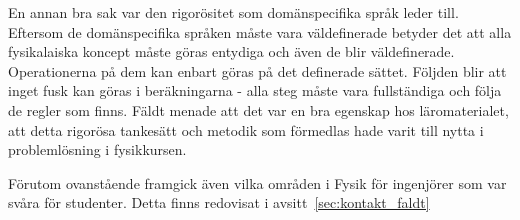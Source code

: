 \begin{draft}
En annan bra sak var den rigorösitet som domänspecifika språk leder till.
Eftersom de domänspecifika språken måste vara väldefinerade betyder det att alla
fysikalaiska koncept måste göras entydiga och även de blir väldefinerade.
Operationerna på dem kan enbart göras på det definerade sättet. Följden blir att
inget fusk kan göras i beräkningarna - alla steg måste vara fullständiga och
följa de regler som finns. Fäldt menade att det var en bra egenskap hos
läromaterialet, att detta rigorösa tankesätt och metodik som förmedlas hade
varit till nytta i problemlösning i fysikkursen.

Förutom ovanstående framgick även vilka områden i Fysik för ingenjörer som var
svåra för studenter. Detta finns redovisat i avsitt~\ref{sec:kontakt_faldt}

\end{draft}































